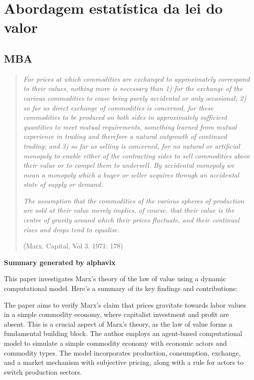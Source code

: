 \newpage
\section{Abordagem estatística da lei do valor}
\subsection{MBA}

\begin{quote}
\textit{For prices at which commodities are exchanged to approximately correspond to their values, nothing more is necessary than 1) for the exchange of the various commodities to cease being purely accidental or only occasional; 2) so far as direct exchange of commodities is concerned, for these commodities to be produced on both sides in approximately sufficient quantities to meet mutual requirements, something learned from mutual experience in trading and therefore a natural outgrowth of continued trading; and 3) so far as selling is concerned, for no natural or artificial monopoly to enable either of the contracting sides to sell commodities above their value or to compel them to undersell. By accidental monopoly we mean a monopoly which a buyer or seller acquires through an accidental state of supply or demand.}

\textit{The assumption that the commodities of the various spheres of production are sold at their value merely implies, of course, that their value is the centre of gravity around which their prices fluctuate, and their continual rises and drops tend to equalise.}

(Marx. Capital, Vol 3. 1971: 178)

\end{quote}

\textbf{Summary generated by alphavix}

This paper investigates Marx's theory of the law of value using a dynamic computational model. Here's a summary of its key findings and contributions:

The paper aims to verify Marx's claim that prices gravitate towards labor values in a simple commodity economy, where capitalist investment and profit are absent. This is a crucial aspect of Marx's theory, as the law of value forms a fundamental building block. The author employs an agent-based computational model to simulate a simple commodity economy with  economic actors and  commodity types. The model incorporates production, consumption, exchange, and a market mechanism with subjective pricing, along with a rule for actors to switch production sectors.

